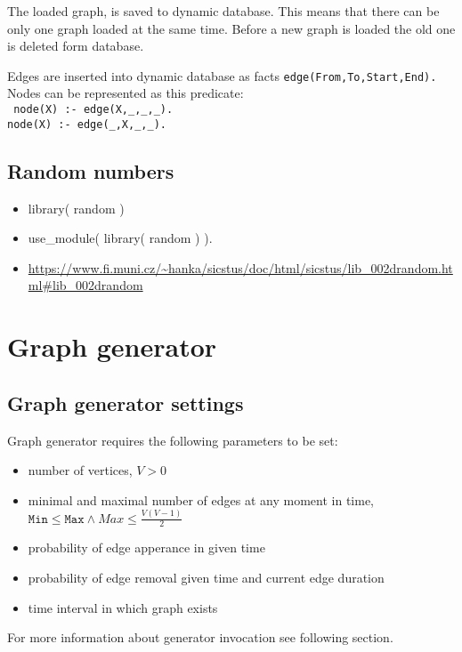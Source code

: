 \documentclass[11pt, a4paper,draft]{article}
\newcommand{\pl}[1]{\texttt{#1}} %
\theoremstyle{plain}
\theoremstyle{definition}
\theoremstyle{remark}
\begin{document}
The loaded graph, is saved to dynamic database. This means that there can be only one graph loaded at the same time. Before a new graph is loaded the old one is deleted form database.

Edges are inserted into dynamic database as facts \pl{edge(From,To,Start,End).}\\
Nodes can be represented as this predicate: \\
\pl{ node(X) :- edge(X,\_,\_,\_). \\
 node(X) :- edge(\_,X,\_,\_).}
 
\subsection{Random numbers}
\label{sec:computing-random}
\begin{itemize}
    \item library( random )
    \item use\_module( library( random ) ).
    \item \url{https://www.fi.muni.cz/~hanka/sicstus/doc/html/sicstus/lib_002drandom.html#lib_002drandom}
\end{itemize}

\section{Graph generator}
\label{sec:generator}

\subsection{Graph generator settings}
\label{sec:generator-settings}

Graph generator requires the following parameters to be set:
\begin{itemize}
    \item number of vertices, $V > 0$
    \item minimal and maximal number of edges at any moment in time, 
        $\pl{Min} \le \pl{Max} \land Max \le \frac{ V(V-1)}{2}$
    \item probability of edge apperance in given time
    \item probability of edge removal given time and current edge duration
    \item time interval in which graph exists
\end{itemize}

For more information about generator invocation see following section.
\end{document}
